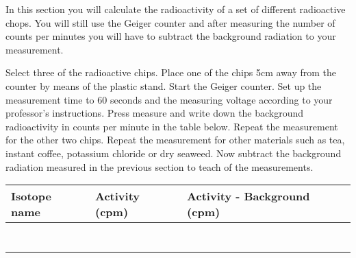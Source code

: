 \documentclass[main.tex]{subfiles}
\begin{document}
\vspace{0.2cm}{\large \bfseries 2. Radioactive chips}
In this section you will calculate the radioactivity of a set of different radioactive chops. You will still use the Geiger counter and after measuring the number of counts per minutes you will have to subtract the background radiation to your measurement.

\begin{steps}
    \newstep[] Select three of the radioactive chips.
        \newstep[]  Place one of the chips 5cm away from the counter by means of the plastic stand. 
        \newstep[]  Start the Geiger counter. Set up the measurement time to 60 seconds and the measuring voltage according to your professor's instructions. Press measure and write down the background radioactivity in counts per minute in the table below.
    \newstep[] Repeat the measurement for the other two chips.
    \newstep[] Repeat the measurement for other materials such as tea, instant coffee, potassium chloride or dry seaweed. 
      \newstep[] Now subtract the background radiation measured in the previous section to teach of the measurements.
      
\end{steps}

\begin{center}\begin{tabular}{ |p{3cm}|p{5cm}|p{5cm}|  }
\hline
    Isotope name &   Activity (cpm) &   Activity - Background (cpm)         \\
\hline
   \vspace{0cm}\vspace{.5cm} &     &            \\
\hline
   \vspace{0cm}\vspace{.5cm} &     &            \\
\hline
   \vspace{0cm}\vspace{.5cm} &     &            \\
\hline
   \vspace{0cm}\vspace{.5cm} &     &            \\
\hline
   \vspace{0cm}\vspace{.5cm} &     &            \\
\hline
   \vspace{0cm}\vspace{.5cm} &     &            \\
\hline
   \vspace{0cm}\vspace{.5cm} &     &            \\
\hline
\end{tabular}\end{center}
 
\end{document}
